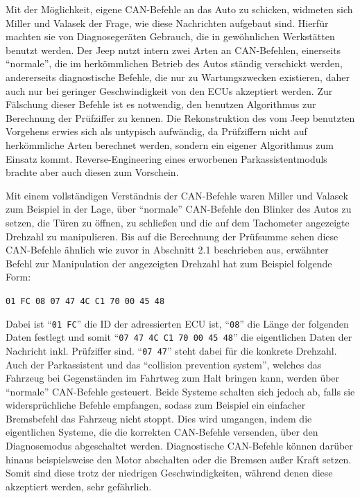 \documentclass[
    fontsize=12pt,
    headings=small,
    parskip=half,           %
    bibliography=totoc,
    numbers=noenddot,       %
    open=any,               %
    ]{scrreprt}
\begin{document}
Mit der Möglichkeit, eigene CAN-Befehle an das Auto zu schicken, widmeten sich Miller und Valasek der Frage, wie diese Nachrichten aufgebaut sind. Hierfür machten sie von Diagnosegeräten Gebrauch, die in gewöhnlichen Werkstätten benutzt werden. Der Jeep nutzt intern zwei Arten an CAN-Befehlen, einerseits "`normale"', die im herkömmlichen Betrieb des Autos ständig verschickt werden, andererseits diagnostische Befehle, die nur zu Wartungszwecken existieren, daher auch nur bei geringer Geschwindigkeit von den ECUs akzeptiert werden. Zur Fälschung dieser Befehle ist es notwendig, den benutzen Algorithmus zur Berechnung der Prüfziffer zu kennen. Die Rekonstruktion des vom Jeep benutzten Vorgehens erwies sich als untypisch aufwändig, da Prüfziffern nicht auf herkömmliche Arten berechnet werden, sondern ein eigener Algorithmus zum Einsatz kommt. Reverse-Engineering eines erworbenen Parkassistentmoduls brachte aber auch diesen zum Vorschein.  \par
Mit einem vollständigen Verständnis der CAN-Befehle waren Miller und Valasek zum Beispiel in der Lage, über "`normale"' CAN-Befehle den Blinker des Autos zu setzen, die Türen zu öffnen, zu schließen und die auf dem Tachometer angezeigte Drehzahl zu manipulieren. Bis auf die Berechnung der Prüfsumme sehen diese CAN-Befehle ähnlich wie zuvor in Abschnitt 2.1 beschrieben aus, erwähnter Befehl zur Manipulation der angezeigten Drehzahl hat zum Beispiel folgende Form: \\

\centerline{\texttt{01 FC 08 07 47 4C C1 70 00 45 48}}

Dabei ist "`\texttt{01 FC}"' die ID der adressierten ECU ist, "`\texttt{08}"' die Länge der folgenden Daten festlegt und somit "`\texttt{07 47 4C C1 70 00 45 48}"' die eigentlichen Daten der Nachricht inkl. Prüfziffer sind. "`\texttt{07 47}"' steht dabei für die konkrete Drehzahl. Auch der Parkassistent und das "`collision prevention system"', welches das Fahrzeug bei Gegenständen im Fahrtweg zum Halt bringen kann, werden über "`normale"' CAN-Befehle gesteuert. Beide Systeme schalten sich jedoch ab, falls sie widersprüchliche Befehle empfangen, sodass zum Beispiel ein einfacher Bremsbefehl das Fahrzeug nicht stoppt. Dies wird umgangen, indem die eigentlichen Systeme, die die korrekten CAN-Befehle versenden, über den Diagnosemodus abgeschaltet werden. Diagnostische CAN-Befehle können darüber hinaus beispielsweise den Motor abschalten oder die Bremsen außer Kraft setzen. Somit sind diese trotz der niedrigen Geschwindigkeiten, während denen diese akzeptiert werden, sehr gefährlich.
\end{document}
